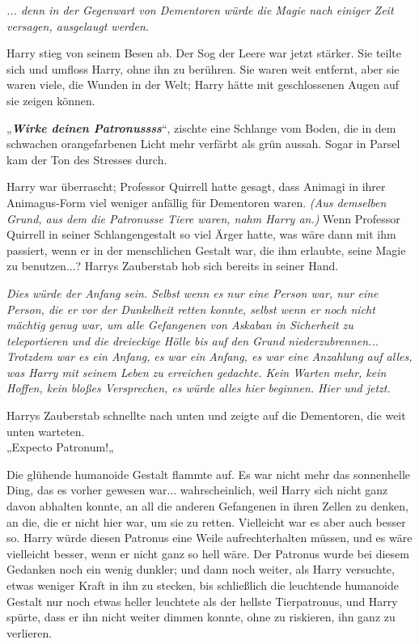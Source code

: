 {\emph{... denn in der Gegenwart von Dementoren würde die Magie nach einiger Zeit versagen, ausgelaugt werden.}

Harry stieg von seinem Besen ab. Der Sog der Leere war jetzt stärker. Sie teilte sich und umfloss Harry, ohne ihn zu berühren. Sie waren weit entfernt, aber sie waren viele, die Wunden in der Welt; Harry hätte mit geschlossenen Augen auf sie zeigen können.

„\textbf{\emph{Wirke deinen Patronussss}}“, zischte eine Schlange vom Boden, die in dem schwachen orangefarbenen Licht mehr verfärbt als grün aussah. Sogar in Parsel kam der Ton des Stresses durch.

Harry war überrascht; Professor Quirrell hatte gesagt, dass Animagi in ihrer Animagus-Form viel weniger anfällig für Dementoren waren. \emph{(Aus demselben Grund, aus dem die Patronusse Tiere waren, nahm Harry an.)} Wenn Professor Quirrell in seiner Schlangengestalt so viel Ärger hatte, was wäre dann mit ihm passiert, wenn er in der menschlichen Gestalt war, die ihm erlaubte, seine Magie zu benutzen...? Harrys Zauberstab hob sich bereits in seiner Hand.

\emph{Dies würde der Anfang sein. Selbst wenn es nur eine Person war, nur eine Person, die er vor der Dunkelheit retten konnte, selbst wenn er noch nicht mächtig genug war, um alle Gefangenen von Askaban in Sicherheit zu teleportieren und die dreieckige Hölle bis auf den Grund niederzubrennen... Trotzdem war es ein Anfang,} \emph{es war ein Anfang, es war eine Anzahlung auf alles, was Harry mit seinem Leben zu erreichen gedachte. Kein Warten mehr, kein Hoffen, kein bloßes Versprechen, es würde alles hier beginnen. Hier und jetzt.}

Harrys Zauberstab schnellte nach unten und zeigte auf die Dementoren, die weit unten warteten.\\

\hfill\break „Expecto Patronum!„

Die glühende humanoide Gestalt flammte auf. Es war nicht mehr das sonnenhelle Ding, das es vorher gewesen war... wahrscheinlich, weil Harry sich nicht ganz davon abhalten konnte, an all die anderen Gefangenen in ihren Zellen zu denken, an die, die er nicht hier war, um sie zu retten. Vielleicht war es aber auch besser so. Harry würde diesen Patronus eine Weile aufrechterhalten müssen, und es wäre vielleicht besser, wenn er nicht ganz so hell wäre. Der Patronus wurde bei diesem Gedanken noch ein wenig dunkler; und dann noch weiter, als Harry versuchte, etwas weniger Kraft in ihn zu stecken, bis schließlich die leuchtende humanoide Gestalt nur noch etwas heller leuchtete als der hellste Tierpatronus, und Harry spürte, dass er ihn nicht weiter dimmen konnte, ohne zu riskieren, ihn ganz zu verlieren.

}
